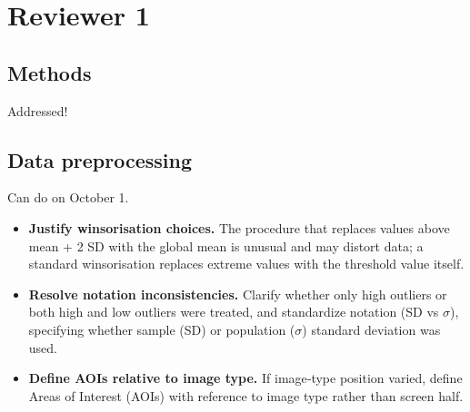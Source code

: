 \documentclass[a4paper, ruler]{CUP-JNL-LIN}%
\begin{document}







\section{Reviewer 1}

\subsection{Methods}

\bigstar Addressed!

\subsection{Data preprocessing}

\bigstar Can do on October 1.

\begin{itemize}
  \item \textbf{Justify winsorisation choices.} The procedure that replaces values above mean + 2 SD with the global mean is unusual and may distort data; a standard winsorisation replaces extreme values with the threshold value itself.
  \item \textbf{Resolve notation inconsistencies.} Clarify whether only high outliers or both high and low outliers were treated, and standardize notation (SD vs $\sigma$), specifying whether sample (SD) or population ($\sigma$) standard deviation was used.
  \item \textbf{Define AOIs relative to image type.} If image‑type position varied, define Areas of Interest (AOIs) with reference to image type rather than screen half.
\end{itemize}
\end{document}
